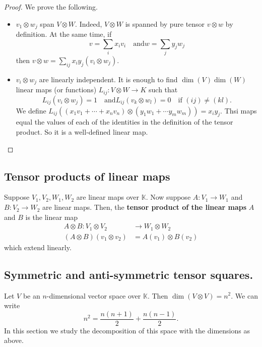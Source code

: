 \documentclass[12pt, a4paper]{article}
\newcommand{\KK}{\mathbb{K}}
\begin{document}
\begin{proof}
    We prove the following.
    \begin{itemize}
        \item \(v_1 \otimes w_j\) span \(V \otimes W\). Indeed, \(V \otimes W\) is spanned by pure tensor \(v\otimes w\) by definition. At the same time, if 
        \[v= \sum_i x_i v_i \quad \text{and} w=\sum_j y_j w_j\]
        then \(v\otimes w  = \sum_{ij} x_i y_j (v_i\otimes w_j)\).
        \item \(v_i \otimes w_j\) are linearly independent. It is enough to find \(\dim(V)\dim(W)\) linear maps (or functions) \(L_{ij} :V \otimes W \to K\) such that 
        \[L_{ij}(v_i\otimes w_j)=1 \quad \text{and} L_{ij}(v_k\otimes w_l) =0 \quad \text{if } (ij)\neq (kl).\]
        We define \(L_{ij}\left( (x_1v_1+\cdots + x_n v_n) \otimes (y_1w_1 + \cdots y_m w_m) \right) =x_i y_j\). Thsi maps equal the values of each of the identities in the definition of the tensor product. So it is a well-defined linear map.
    \end{itemize}
\end{proof}

\subsection{Tensor products of linear maps}

\begin{definition}
    Suppose \(V_1,V_2,W_1,W_2\) are linear maps over \(\KK\). Now suppose \(A :V_1 \to W_1\) and \(B : V_2 \to W_2\) are linear maps. Then, the \textbf{tensor product of the linear maps} \(A\) and \(B\) is the linear map 
    \[\begin{aligned}
        A \otimes B : V_1 \otimes V_2 &\to W_1 \otimes W_2 \\
        (A\otimes B)(v_1 \otimes v_2) &= A(v_1)\otimes B(v_2)
    \end{aligned}\]
    which extend linearly.
\end{definition}


\subsection{Symmetric and anti-symmetric tensor squares.}

\begin{mdnote}
    Let \(V\) be an \(n\)-dimensional vector space over \(\KK\). Then \(\dim(V\otimes V)=n^2\). We can write 
    \[n^2 = \frac{n(n+1)}{2}+\frac{n(n-1)}{2}.\]
    In this section we study the decomposition of this space with the dimensions as above.
\end{mdnote}
\end{document}
